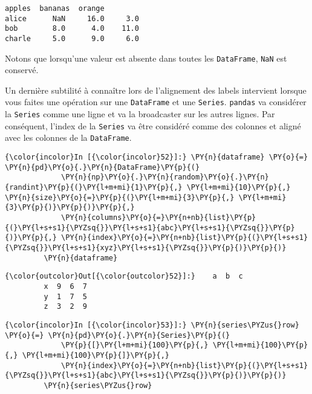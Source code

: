     \begin{Verbatim}[commandchars=\\\{\}]
        apples  bananas  orange
alice      NaN     16.0     3.0
bob        8.0      4.0    11.0
charle     5.0      9.0     6.0

    \end{Verbatim}

    Notons que lorsqu'une valeur est absente dans toutes les
\texttt{DataFrame}, \texttt{NaN} est conservé.

    Un dernière subtilité à connaître lors de l'alignement des labels
intervient lorsque vous faites une opération sur une \texttt{DataFrame}
et une \texttt{Series}. \texttt{pandas} va considérer la \texttt{Series}
comme une ligne et va la broadcaster sur les autres lignes. Par
conséquent, l'index de la \texttt{Series} va être considéré comme des
colonnes et aligné avec les colonnes de la \texttt{DataFrame}.

    \begin{Verbatim}[commandchars=\\\{\}]
{\color{incolor}In [{\color{incolor}52}]:} \PY{n}{dataframe} \PY{o}{=} \PY{n}{pd}\PY{o}{.}\PY{n}{DataFrame}\PY{p}{(}
             \PY{n}{np}\PY{o}{.}\PY{n}{random}\PY{o}{.}\PY{n}{randint}\PY{p}{(}\PY{l+m+mi}{1}\PY{p}{,} \PY{l+m+mi}{10}\PY{p}{,} \PY{n}{size}\PY{o}{=}\PY{p}{(}\PY{l+m+mi}{3}\PY{p}{,} \PY{l+m+mi}{3}\PY{p}{)}\PY{p}{)}\PY{p}{,}
             \PY{n}{columns}\PY{o}{=}\PY{n+nb}{list}\PY{p}{(}\PY{l+s+s1}{\PYZsq{}}\PY{l+s+s1}{abc}\PY{l+s+s1}{\PYZsq{}}\PY{p}{)}\PY{p}{,} \PY{n}{index}\PY{o}{=}\PY{n+nb}{list}\PY{p}{(}\PY{l+s+s1}{\PYZsq{}}\PY{l+s+s1}{xyz}\PY{l+s+s1}{\PYZsq{}}\PY{p}{)}\PY{p}{)}
         \PY{n}{dataframe}
\end{Verbatim}


\begin{Verbatim}[commandchars=\\\{\}]
{\color{outcolor}Out[{\color{outcolor}52}]:}    a  b  c
         x  9  6  7
         y  1  7  5
         z  3  2  9
\end{Verbatim}
            
    \begin{Verbatim}[commandchars=\\\{\}]
{\color{incolor}In [{\color{incolor}53}]:} \PY{n}{series\PYZus{}row} \PY{o}{=} \PY{n}{pd}\PY{o}{.}\PY{n}{Series}\PY{p}{(}
             \PY{p}{[}\PY{l+m+mi}{100}\PY{p}{,} \PY{l+m+mi}{100}\PY{p}{,} \PY{l+m+mi}{100}\PY{p}{]}\PY{p}{,}
             \PY{n}{index}\PY{o}{=}\PY{n+nb}{list}\PY{p}{(}\PY{l+s+s1}{\PYZsq{}}\PY{l+s+s1}{abc}\PY{l+s+s1}{\PYZsq{}}\PY{p}{)}\PY{p}{)}
         \PY{n}{series\PYZus{}row}
\end{Verbatim}


